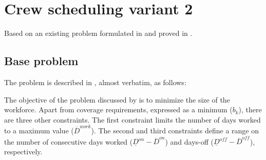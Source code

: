 \documentclass[a4paper,11pt]{article}
\begin{document}









\section{Crew scheduling variant 2}

    Based on an existing problem formulated in \cite{Smet2015} and proved in \cite{Brunner2013}.


    \subsection{Base problem}

    The problem is described in \cite{Smet2015}, almost verbatim, as follows:

    The objective of the problem discussed by \cite{Brunner2013} is to minimize the size of the workforce. Apart from coverage requirements, expressed as a minimum ($b_{k}$), there are three other constraints. The first constraint limits the number of days worked to a maximum value ($\overline{D}^{work}$). The second and third constraints define a range on the number of consecutive days worked ($\underline{D}^{on} - \overline{D}^{on}$) and days-off ($\underline{D}^{off} - \overline{D}^{off}$), respectively.

    \vskip 0.3cm
\end{document}
